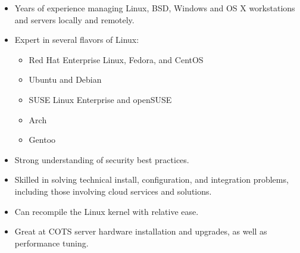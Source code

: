 \documentclass[a4paper,12pt]{memoir} %
\begin{document}
\userinformation %

\framebreak %





\begin{itemize}
  \item Years of experience managing Linux, BSD,
    Windows and OS X workstations and servers locally and remotely.
  \item Expert in several flavors of Linux:
    \begin{itemize}
      \item Red Hat Enterprise Linux, Fedora, and CentOS
      \item Ubuntu and Debian
      \item SUSE Linux Enterprise and openSUSE
      \item Arch
      \item Gentoo
    \end{itemize}
  \item Strong understanding of security best practices.
  \item Skilled in solving technical install, configuration, and integration problems, including
    those involving cloud services and solutions.
  \item Can recompile the Linux kernel with relative ease.
  \item Great at COTS server hardware installation and upgrades, as well as performance tuning.
\end{itemize}
\Sep
\end{document}
